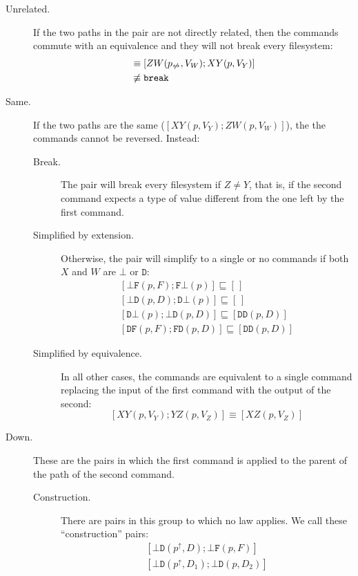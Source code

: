 \documentclass[12pt]{article}
\newcommand{\empt}{\bot}
\newcommand{\pp}{p^\uparrow} %
\newcommand{\np}{p_{\centernot\leftrightarrow}} %
\newcommand{\cbrk}{\mathtt{break}}
\newcommand{\fscommand}[2]{{#1#2}}
\newcommand{\fsregcommandchar}[1]{\mathtt{#1}}
\newcommand{\fsregcommand}[2]{\fscommand{\fsregcommandchar{#1}}{\fsregcommandchar{#2}}}
\newcommand{\cbf}{\fsregcommand{\empt}{F}}
\newcommand{\cbd}{\fsregcommand{\empt}{D}}
\newcommand{\cfb}{\fsregcommand{F}{\empt}}
\newcommand{\cfd}{\fsregcommand{F}{D}}
\newcommand{\cdb}{\fsregcommand{D}{\empt}}
\newcommand{\cdf}{\fsregcommand{D}{F}}
\newcommand{\cdd}{\fsregcommand{D}{D}}
\newcommand{\cxy}{\fscommand{X}{Y}}
\newcommand{\cyz}{\fscommand{Y}{Z}}
\newcommand{\cxz}{\fscommand{X}{Z}}
\newcommand{\czw}{\fscommand{Z}{W}}
\newcommand{\eqext}{\sqsubseteq}
\newcommand{\nequiv}{\not\equiv}
\newcommand{\emptyseq}{[\,]}
\begin{document}
\begin{description}
\item[Unrelated.] If the two paths in the pair are not directly related, then
the commands commute with an equivalence and they will not break every filesystem:
\begin{align*}
[\cxy(p,V_Y); \czw(\np,V_W)] &\equiv [\czw(\np,V_W); \cxy(p,V_Y)] \\
&\nequiv \cbrk
\end{align*}
%
\item[Same.] If the two paths are the same ($[\cxy(p,V_Y); \czw(p,V_W)]$), the
the commands cannot be reversed. Instead:
   \begin{description}
   \item[Break.]
   The pair will break every filesystem if $Z\ne Y$, that is, if the second
   command expects a type of value different from the one left by the first command.
   \item[Simplified by extension.]
   Otherwise, the pair will simplify to a single or no commands
   if both $X$ and $W$ are $\fsregcommandchar{\empt}$ or $\fsregcommandchar{D}$:
   \begin{gather*}
            [\cbf(p, F); \cfb(p)] \eqext \emptyseq \\
            [\cbd(p, D); \cdb(p)] \eqext \emptyseq \\
            [\cdb(p); \cbd(p, D)] \eqext [\cdd(p, D)] \\
            [\cdf(p, F); \cfd(p, D)] \eqext [\cdd(p, D)]
   \end{gather*}
   \item[Simplified by equivalence.]
   In all other cases, the commands are equivalent to a single command
   replacing the input of the first command with the output of the second:
   \[ [\cxy(p, V_Y); \cyz(p, V_Z)] \equiv [\cxz(p, V_Z)] \]
   \end{description}
%
\item[Down.]
These are the pairs in which the first command is applied to the parent of the path
of the second command.
   \begin{description}
   \item[Construction.] There are pairs in this group to which no law applies.
   We call these ``construction'' pairs:
   \begin{gather*}
            [\cbd(\pp, D); \cbf(p, F)] \\
            [\cbd(\pp, D_1); \cbd(p, D_2)] \\

\end{gather*}
\end{description}
\end{description}
\end{document}
